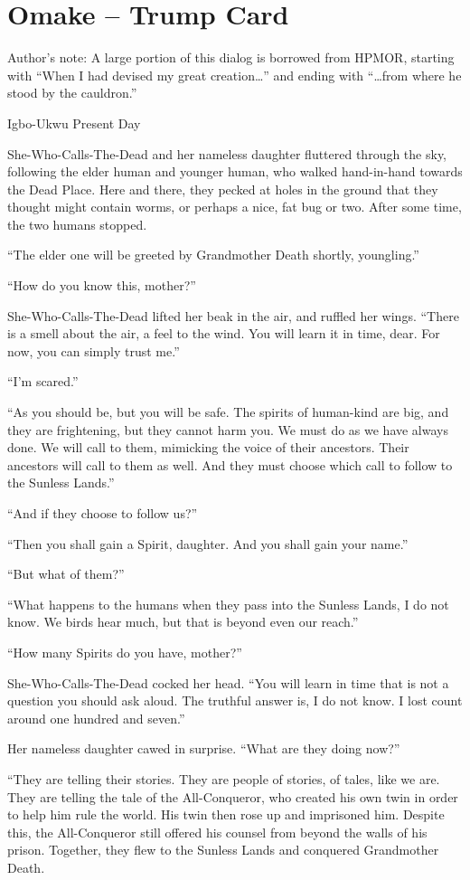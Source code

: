 \chapter{Omake – Trump Card}
Author’s note:
A large portion of this dialog is borrowed from HPMOR, starting with “When I had devised my great creation…” and ending with “…from where he stood by the cauldron.”

Igbo-Ukwu 
Present Day

She-Who-Calls-The-Dead and her nameless daughter fluttered through the sky, following the elder human and younger human, who walked hand-in-hand towards the Dead Place. Here and there, they pecked at holes in the ground that they thought might contain worms, or perhaps a nice, fat bug or two. After some time, the two humans stopped.

“The elder one will be greeted by Grandmother Death shortly, youngling.”

“How do you know this, mother?”

She-Who-Calls-The-Dead lifted her beak in the air, and ruffled her wings. “There is a smell about the air, a feel to the wind. You will learn it in time, dear. For now, you can simply trust me.”

“I’m scared.”

“As you should be, but you will be safe. The spirits of human-kind are big, and they are frightening, but they cannot harm you. We must do as we have always done. We will call to them, mimicking the voice of their ancestors. Their ancestors will call to them as well. And they must choose which call to follow to the Sunless Lands.”

“And if they choose to follow us?”

“Then you shall gain a Spirit, daughter. And you shall gain your name.”

“But what of them?”

“What happens to the humans when they pass into the Sunless Lands, I do not know. We birds hear much, but that is beyond even our reach.”

“How many Spirits do you have, mother?”

She-Who-Calls-The-Dead cocked her head. “You will learn in time that is not a question you should ask aloud. The truthful answer is, I do not know. I lost count around one hundred and seven.”

Her nameless daughter cawed in surprise. “What are they doing now?”

“They are telling their stories. They are people of stories, of tales, like we are. They are telling the tale of the All-Conqueror, who created his own twin in order to help him rule the world. His twin then rose up and imprisoned him. Despite this, the All-Conqueror still offered his counsel from beyond the walls of his prison. Together, they flew to the Sunless Lands and conquered Grandmother Death.

